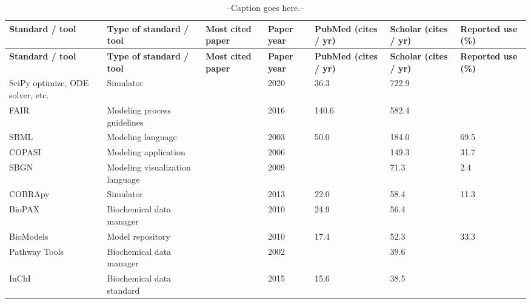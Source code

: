 
\begin{longtable}{L{2.2cm}L{4cm}L{1cm}L{0.8cm}R{1.1cm}R{1cm}R{1cm}}
\caption{--Caption goes here.--}\\
\toprule
\textbf{\scriptsize{Standard / tool}} &\textbf{\scriptsize{Type of standard / tool}} &\textbf{\scriptsize{Most cited paper}} &\textbf{\scriptsize{Paper year}} &\textbf{\scriptsize{PubMed (cites / yr)}} &\textbf{\scriptsize{Scholar (cites / yr)}} &\textbf{\scriptsize{Reported use (\%)}}\\
\endfirsthead
\toprule
\textbf{\scriptsize{Standard / tool}} &\textbf{\scriptsize{Type of standard / tool}} &\textbf{\scriptsize{Most cited paper}} &\textbf{\scriptsize{Paper year}} &\textbf{\scriptsize{PubMed (cites / yr)}} &\textbf{\scriptsize{Scholar (cites / yr)}} &\textbf{\scriptsize{Reported use (\%)}}\\
\midrule
\endhead
\midrule
\small{SciPy optimize, ODE solver, etc.} &\small{Simulator} &\cite{virtanen2020scipy} &\small{2020} &\small{36.3} &\small{722.9} &\small{}\\
\midrule
\small{FAIR} &\small{Modeling process guidelines} &\cite{Wilkinson2016TheStewardship.} &\small{2016} &\small{140.6} &\small{582.4} &\small{}\\
\midrule
\small{SBML} &\small{Modeling language} &\cite{Hucka2003TheModels} &\small{2003} &\small{50.0} &\small{184.0} &\small{69.5}\\
\midrule
\small{COPASI} &\small{Modeling application} &\cite{Hoops2006COPASI--aSImulator} &\small{2006} &\small{} &\small{149.3} &\small{31.7}\\
\midrule
\small{SBGN} &\small{Modeling visualization language} &\cite{Novere2009TheNotation} &\small{2009} &\small{} &\small{71.3} &\small{2.4}\\
\midrule
\small{COBRApy} &\small{Simulator} &\cite{ebrahim2013cobrapy} &\small{2013} &\small{22.0} &\small{58.4} &\small{11.3}\\
\midrule
\small{BioPAX} &\small{Biochemical data manager} &\cite{Demir2010TheSharing.} &\small{2010} &\small{24.9} &\small{56.4} &\small{}\\
\midrule
\small{BioModels} &\small{Model repository} &\cite{Li2010BioModelsModelsb} &\small{2010} &\small{17.4} &\small{52.3} &\small{33.3}\\
\midrule
\small{Pathway Tools} &\small{Biochemical data manager} &\cite{karp2002pathway} &\small{2002} &\small{} &\small{39.6} &\small{}\\
\midrule
\small{InChI} &\small{Biochemical data standard} &\cite{Heller2015InChIIdentifier.} &\small{2015} &\small{15.6} &\small{38.5} &\small{}\\

\end{longtable}
